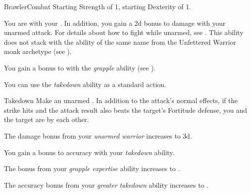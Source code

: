     \begin{feat}{Brawler}{Combat}
        \featpre Starting Strength of 1, starting Dexterity of 1.

         You are  with your .
        In addition, you gain a \plus2d bonus to damage with your unarmed attack.
        For details about how to fight while unarmed, see .
        This ability does not stack with the ability of the same name from the Unfettered Warrior monk archetype (see ).

         You gain a  bonus to  with the \textit{grapple} ability (see ).

         You can use the \textit{takedown} ability as a standard action.
        \begin{apability}{Takedown}
            Make an unarmed .
            In addition to the attack's normal effects, if the strike hits and the attack result also beats the target's Fortitude defense, you and the target are \grappled by each other.
        \end{apability}

         The damage bonus from your \textit{unarmed warrior} increases to \plus3d.

         You gain a  bonus to accuracy with your \textit{takedown} ability.

         The bonus from your \textit{grapple expertise} ability increases to .

         The accuracy bonus from your \textit{greater takedown} ability increases to .
    \end{feat}


